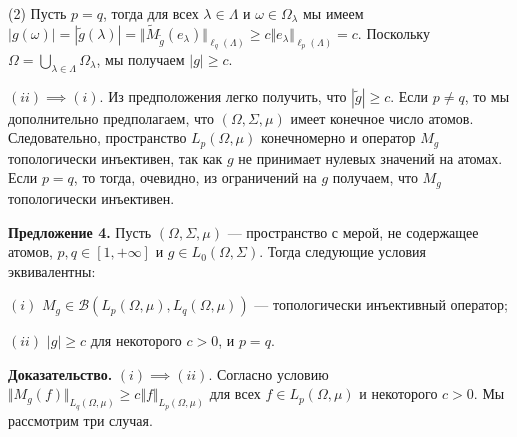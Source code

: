 \documentclass[11pt,twoside]{article}
\begin{document}
(2) Пусть $p=q$, тогда для всех $\lambda\in\Lambda$ и
$\omega\in\Omega_\lambda$ мы имеем $|g(\omega)|=|\widetilde{g}(\lambda)|
=\Vert \widetilde{M}_{\widetilde{g}}(e_\lambda)\Vert_{\ell_q(\Lambda)} \geq
c\Vert e_\lambda\Vert_{\ell_p(\Lambda)} =c$. Поскольку
$\Omega=\bigcup_{\lambda\in\Lambda}\Omega_\lambda$, мы получаем $|g|\geq c$.

$(ii)$$\implies$$ (i)$. Из предположения легко получить, что
$|\widetilde{g}|\geq c$. Если $p\neq q$, то мы дополнительно предполагаем,
что $(\Omega,\Sigma,\mu)$ имеет конечное число атомов. Следовательно,
пространство $L_p(\Omega,\mu)$ конечномерно и оператор $M_g$ топологически
инъективен, так как $g$ не принимает нулевых значений на атомах. Если $p=q$,
то тогда, очевидно, из ограничений на $g$ получаем, что $M_{g}$
топологически инъективен.


\textbf{Предложение 4.} Пусть $(\Omega,\Sigma,\mu)$ --- пространство с
мерой, не содержащее атомов, $p,q\in[1,+\infty]$ и $g\in
L_0(\Omega,\Sigma)$. Тогда следующие условия эквивалентны:

$(i)$ $M_g\in\mathcal{B}(L_p(\Omega,\mu),L_q(\Omega,\mu))$ --- топологически
инъективный оператор;

$(ii)$ $|g|\geq c$ для некоторого $c>0$, и $p=q$.

\textbf{Доказательство.} 
$(i)$$\implies$$ (ii)$. Согласно условию $\Vert
M_g(f)\Vert_{L_q(\Omega,\mu)}\geq c\Vert f\Vert_{L_p(\Omega,\mu)}$ для всех
$f\in L_p(\Omega,\mu)$ и некоторого $c>0$. Мы рассмотрим три случая.
\end{document}
